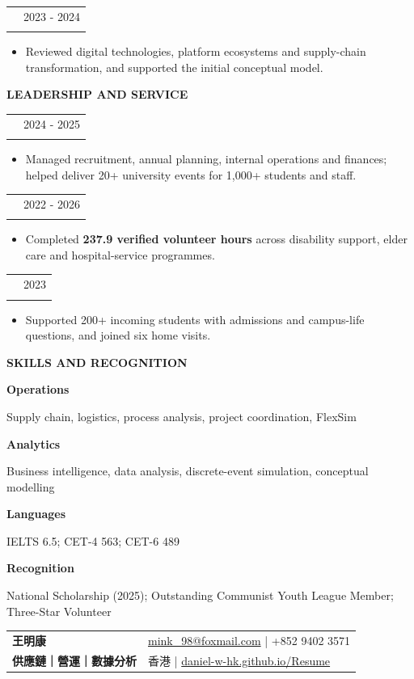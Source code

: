 \documentclass[10pt,a4paper]{article}
\makeatletter
\newcommand{\sectiontitle}[1]{%
  \vspace{5pt}%
  {\color{Navy}\bfseries\fontsize{11.4}{12.8}\selectfont #1}\par
  \vspace{1.2pt}{\color{Rule}\hrule height 0.55pt}\vspace{3pt}%
}
\newcommand{\roleline}[3]{%
  \begin{tabularx}{\textwidth}{@{}>{\raggedright\arraybackslash}X>{\raggedleft\arraybackslash}p{34mm}@{}}
    {\bfseries\color{Navy}#1} & {\fontsize{8.65}{10.2}\selectfont\color{Slate}#3}\\[-0.3pt]
    {\fontsize{8.7}{10.3}\selectfont\color{Slate}#2} &
  \end{tabularx}\vspace{-0.5pt}%
}
\newcommand{\skillrow}[2]{%
  \noindent
  \parbox[t]{23mm}{\strut\bfseries\color{Navy}#1}%
  \hspace{4mm}%
  \parbox[t]{\dimexpr\textwidth-27mm\relax}{\strut#2}%
  \par\vspace{2.2pt}%
}
\makeatother
\begin{document}
\roleline{Digital Technologies and Platforms in Logistics Service Ecosystems}{Research Team Member, University SRTP}{2023 - 2024}
\begin{itemize}
  \item Reviewed digital technologies, platform ecosystems and supply-chain transformation, and supported the initial conceptual model.
\end{itemize}

\sectiontitle{LEADERSHIP AND SERVICE}
\roleline{Vice President, Science and Technology Association}{School of Economics and Management, Southeast University}{2024 - 2025}
\begin{itemize}
  \item Managed recruitment, annual planning, internal operations and finances; helped deliver 20+ university events for 1,000+ students and staff.
\end{itemize}

\roleline{Three-Star Volunteer}{Southeast University}{2022 - 2026}
\begin{itemize}
  \item Completed \textbf{237.9 verified volunteer hours} across disability support, elder care and hospital-service programmes.
\end{itemize}

\roleline{Member, Incoming Student Home-Visit Team}{Southeast University}{2023}
\begin{itemize}
  \item Supported 200+ incoming students with admissions and campus-life questions, and joined six home visits.
\end{itemize}

\sectiontitle{SKILLS AND RECOGNITION}
\skillrow{Operations}{Supply chain, logistics, process analysis, project coordination, FlexSim}
\skillrow{Analytics}{Business intelligence, data analysis, discrete-event simulation, conceptual modelling}
\skillrow{Languages}{IELTS 6.5; CET-4 563; CET-6 489}
\skillrow{Recognition}{National Scholarship (2025); Outstanding Communist Youth League Member; Three-Star Volunteer}

\newpage
\fontsize{9.15}{11.35}\selectfont
\raggedright

\begin{tabularx}{\textwidth}{@{}X>{\raggedleft\arraybackslash}p{88mm}@{}}
  {\fontsize{25}{27}\selectfont\bfseries\color{Navy} 王明康} &
  \href{mailto:mink_98@foxmail.com}{mink\_98@foxmail.com} \quad | \quad +852 9402 3571\\[2pt]
  {\fontsize{10.5}{12}\selectfont\bfseries\color{Teal} 供應鏈｜營運｜數據分析} &
  香港 \quad | \quad \href{https://daniel-w-hk.github.io/Resume/}{daniel-w-hk.github.io/Resume}
\end{tabularx}
\end{document}
